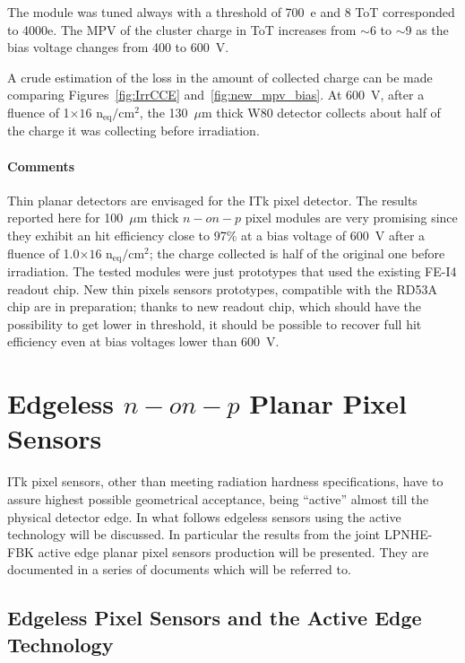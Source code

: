 The module was tuned always with a threshold of 700~e and 8 ToT corresponded to 4000e. 
The MPV of the cluster charge in ToT increases from $\sim$6 to $\sim$9 as the bias voltage
 changes from 400 to 600~V. 
 
 A crude estimation of the loss in the amount of collected charge 
 can be made comparing Figures~\ref{fig:IrrCCE} and~\ref{fig:new_mpv_bias}. At 600~V, after 
 a fluence of 1$\times{16}$ n$_\text{eq}/\text{cm}^2$, the 130~$\mu$m thick W80 detector 
 collects about half of the charge it was collecting before irradiation.
 
 

\paragraph{Comments}
Thin planar detectors are envisaged for the ITk pixel detector. The results reported here for 100~$\mu$m 
thick $n-on-p$ pixel modules are very promising since they exhibit an hit efficiency close to 
97\% at a bias voltage of 600~V after a fluence of 1.0$\times{16}$ n$_\text{eq}/\text{cm}^2$; 
the charge collected is half of the original one before irradiation.
 The tested 
modules were just 
prototypes that used the existing FE-I4 readout chip. New thin pixels sensors prototypes, compatible 
with the RD53A chip are in preparation; thanks to new readout chip, which should have 
the possibility to get lower in threshold, it should be possible to recover full hit efficiency even at  
bias voltages lower than 600~V. 
 

\section{Edgeless $n-on-p$ Planar Pixel Sensors}
\label{sec:edgeless}

ITk pixel sensors, other than meeting radiation hardness specifications, have to assure highest 
possible geometrical acceptance, being ``active'' almost till the physical detector edge.
In what follows edgeless sensors using the active technology will be discussed.  
In particular the results from the joint LPNHE-FBK  active edge planar pixel sensors production will be presented. They are documented in a series of documents which will be referred to.

\subsection{Edgeless Pixel Sensors and the Active Edge Technology}

